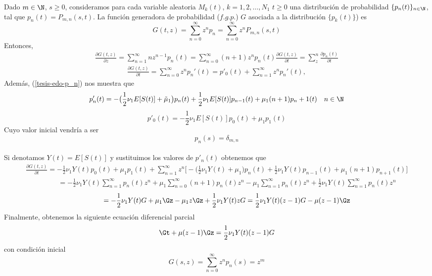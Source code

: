 Dado $m\in\N$, $s\geq 0$, consideramos para cada variable aleatoria $M_k(t)$, $k=1,2,\ldots,N_1$ $t\geq 0$ una distribución de probabilidad $\{p_n(t)\}_{n\in\N}$, tal que $p_n(t)=P_{m,n}(s,t)$. La función generadora de probabilidad ($f.g.p.$) $G$ asociada a la distribución $\{p_k(t)\}$) es
\begin{equation}
    G(t,z)=\sum_{n=0}^\infty z^n p_n=\sum_{n=0}^\infty z^n P_{m,n}(s,t)\label{tesis-funcGeneradoraDeM}
\end{equation}
Entonces,
\begin{eqnarray}
    \frac{\partial G(t,z)}{\partial z}=\sum_{n=1}^\infty n z^{n-1}p_n(t)=\sum_{n=0}^\infty (n+1)z^{n}p_n(t)
    \frac{\partial G(t,z)}{\partial t} = \sum_z^n \frac{\partial p_n(t)}{\partial t}
\end{eqnarray}
\begin{eqnarray}
    \frac{\partial G(t,z)}{\partial t}=\sum_{n=0}^\infty z^n p_n'(t)=p'_0(t)+\sum_{n=1}^\infty z^n p_n'(t),
\end{eqnarray}
Además, (\ref{tesis-edo-p_n}) nos muestra que $$p'_n(t)=-\big(\frac{1}{2}\nu_1E[S(t)]+\tilde{\mu}_1\big)p_n(t)+\frac{1}{2}\nu_1E[S(t)]p_{n-1}(t)+\mu_1 (n+1)p_n+1(t) \quad n\in\N$$
$$p'_0(t)=-\frac{1}{2}\nu_1E[S(t)] p_0(t)+\mu_1 p_1(t)$$
Cuyo valor inicial vendría a ser $$p_n(s)=\delta_{m,n}$$\\
Si denotamos $Y(t)=E[S(t)]$ y sustituimos los valores de $p'_n(t)$ obtenemos que
\begin{eqnarray*}
    \frac{\partial G(t,z)}{\partial t} =-\frac{1}{2}\nu_1Y(t)p_0(t)+\mu_1 p_1(t)+\sum_{n=1}^\infty z^n\big[-\big(\frac{1}{2}\nu_1Y(t)+\mu_1)p_n(t)+\frac{1}{2}\nu_1Y(t)p_{n-1}(t)+\mu_1(n+1)p_{n+1}(t)\big]
\end{eqnarray*}
\begin{eqnarray*}
    \quad\quad\quad=-\frac{1}{2}\nu_1Y(t)\sum_{n=1}^\infty p_n(t)z^n+\mu_1\sum_{n=0}^\infty (n+1)p_n(t)z^n-\mu_1\sum_{n=1}^\infty p_n(t)z^n+\frac{1}{2}\nu_1Y(t)\sum_{n=1}^\infty p_n(t)z^n
\end{eqnarray*}
\begin{eqnarray*}
   \quad\quad\quad=-\frac{1}{2}\nu_1Y(t)G+\mu_1\Gz-\mu_1z\Gz+\frac{1}{2}\nu_1Y(t)z G=\frac{1}{2}\nu_1Y(t)(z-1)G-\mu(z-1)\Gz
\end{eqnarray*}
Finalmente, obtenemos la siguiente ecuación diferencial parcial
$$ \Gt+\mu(z-1)\Gz=\frac{1}{2}\nu_1Y(t)(z-1)G$$
con condición inicial
$$G(s,z)=\sum_{n=0}^\infty z^n p_n(s)=z^m$$
